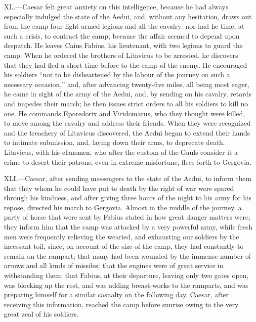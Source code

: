 XL.—Caesar felt great anxiety on this intelligence, because he had
always especially indulged the state of the Aedui, and, without any
hesitation, draws out from the camp four light-armed legions and all the
cavalry: nor had he time, at such a crisis, to contract the camp,
because the affair seemed to depend upon despatch. He leaves Caius
Fabius, his lieutenant, with two legions to guard the camp. When he
ordered the brothers of Litavicus to be arrested, he discovers that they
had fled a short time before to the camp of the enemy. He encouraged his
soldiers ``not to be disheartened by the labour of the journey on such a
necessary occasion,'' and, after advancing twenty-five miles, all being
most eager, he came in sight of the army of the Aedui, and, by sending
on his cavalry, retards and impedes their march; he then issues strict
orders to all his soldiers to kill no one. He commands Eporedorix and
Viridomarus, who they thought were killed, to move among the cavalry and
address their friends. When they were recognized and the treachery of
Litavicus discovered, the Aedui began to extend their hands to intimate
submission, and, laying down their arms, to deprecate death. Litavicus,
with his clansmen, who after the custom of the Gauls consider it a crime
to desert their patrons, even in extreme misfortune, flees forth to
Gergovia.

XLI.—Caesar, after sending messengers to the state of the Aedui, to
inform them that they whom he could have put to death by the right of
war were spared through his kindness, and after giving three hours of
the night to his army for his repose, directed his march to Gergovia.
Almost in the middle of the journey, a party of horse that were sent by
Fabius stated in how great danger matters were; they inform him that the
camp was attacked by a very powerful army, while fresh men were
frequently relieving the wearied, and exhausting our soldiers by the
incessant toil, since, on account of the size of the camp, they had
constantly to remain on the rampart; that many had been wounded by the
immense number of arrows and all kinds of missiles; that the engines
were of great service in withstanding them; that Fabius, at their
departure, leaving only two gates open, was blocking up the rest, and
was adding breast-works to the ramparts, and was preparing himself for a
similar casualty on the following day. Caesar, after receiving this
information, reached the camp before sunrise owing to the very great
zeal of his soldiers.

